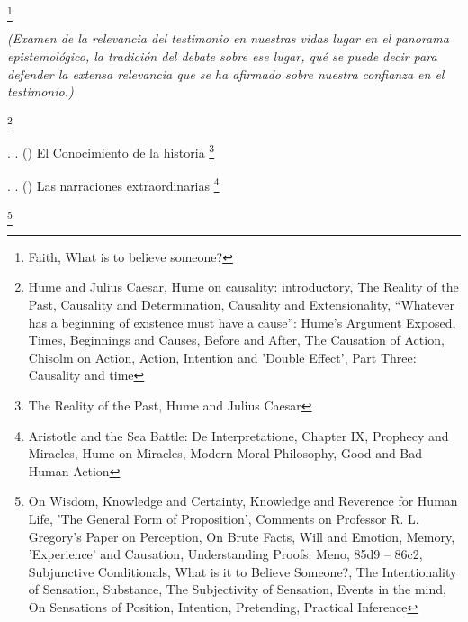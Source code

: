 \documentclass[11pt]{article}
\begin{document}
{\begin{spacing}{1.7}
\tab {}
\footnote{
Faith, 
What is to believe someone?
}

\emph{(Examen de la relevancia del testimonio en nuestras vidas lugar en el panorama epistemológico, la tradición del debate sobre ese lugar, qué se puede decir para defender la extensa relevancia que se ha afirmado sobre nuestra confianza en el testimonio.)}

\tab {}
\footnote{
Hume and Julius Caesar, 
Hume on causality: introductory, 
The Reality of the Past, 
Causality and Determination, 
Causality and Extensionality, 
“Whatever has a beginning of existence must have a cause”: Hume's Argument Exposed, 
Times, Beginnings and Causes, 
Before and After, 
The Causation of Action, 
Chisolm on Action, 
Action, Intention and 'Double Effect', 
Part Three: Causality and time
}

\tab \tab \tab {}. 
. 
()
El Conocimiento de la historia
\footnote{
The Reality of the Past, 
Hume and Julius Caesar
}

\tab \tab \tab {}. 
. 
()
Las narraciones extraordinarias
\footnote{
Aristotle and the Sea Battle: De Interpretatione, Chapter IX, 
Prophecy and Miracles, 
Hume on Miracles, 
Modern Moral Philosophy, 
Good and Bad Human Action
}

\tab {}
\footnote{
On Wisdom, 
Knowledge and Certainty, 
Knowledge and Reverence for Human Life, 
'The General Form of Proposition', 
Comments on Professor R. L. Gregory's Paper on Perception, 
On Brute Facts, 
Will and Emotion, 
Memory, 'Experience' and Causation, 
Understanding Proofs: Meno, 85d9 – 86c2, 
Subjunctive Conditionals, 
What is it to Believe Someone?, 
The Intentionality of Sensation, 
Substance, 
The Subjectivity of Sensation, 
Events in the mind, 
On Sensations of Position, 
Intention, 
Pretending, 
Practical Inference
}



\end{spacing}}
\end{document}
